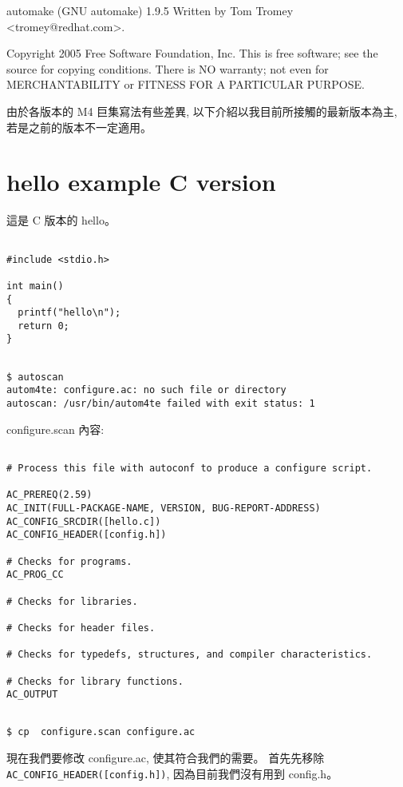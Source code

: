 \documentclass[12pt,a4]{article}
\begin{document}
\begin{CJK}{UTF8}{cwmu}
automake (GNU automake) 1.9.5
Written by Tom Tromey <tromey@redhat.com>.

Copyright 2005 Free Software Foundation, Inc.
This is free software; see the source for copying conditions.  There is NO
warranty; not even for MERCHANTABILITY or FITNESS FOR A PARTICULAR PURPOSE.

由於各版本的 M4 巨集寫法有些差異, 以下介紹以我目前所接觸的最新版本為主,
若是之前的版本不一定適用。

\section{hello example C version}\label{c_hello}

這是 C 版本的 hello。
\begin{verbatim}

#include <stdio.h>

int main()
{
  printf("hello\n");
  return 0;
}
\end{verbatim}

\begin{verbatim}

$ autoscan
autom4te: configure.ac: no such file or directory
autoscan: /usr/bin/autom4te failed with exit status: 1

\end{verbatim}
configure.scan 內容:
\begin{verbatim}

# Process this file with autoconf to produce a configure script.

AC_PREREQ(2.59)
AC_INIT(FULL-PACKAGE-NAME, VERSION, BUG-REPORT-ADDRESS)
AC_CONFIG_SRCDIR([hello.c])
AC_CONFIG_HEADER([config.h])

# Checks for programs.
AC_PROG_CC

# Checks for libraries.

# Checks for header files.

# Checks for typedefs, structures, and compiler characteristics.

# Checks for library functions.
AC_OUTPUT
\end{verbatim}

\begin{verbatim}

$ cp  configure.scan configure.ac
\end{verbatim}

現在我們要修改  configure.ac, 使其符合我們的需要。
首先先移除 \verb+ AC_CONFIG_HEADER([config.h])+,
因為目前我們沒有用到 config.h。


\end{CJK}
\end{document}
